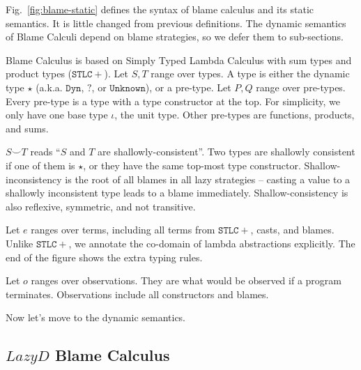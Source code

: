 \documentclass[acmsmall,review,anonymous]{acmart}\settopmatter{printfolios=true,printccs=false,printacmref=false}
\newcommand{\figref}[1]{Fig.~\ref{#1}}
\begin{document}
\figref{fig:blame-static} defines the syntax of blame calculus and its static 
semantics. It is little changed from previous definitions. 
The dynamic semantics of Blame Calculi depend on blame strategies, so we defer 
them to sub-sections.

Blame Calculus is based on Simply Typed Lambda Calculus with sum types and 
product types ($ \mathtt{STLC+} $). 
Let $ S,T $ range over types. A type is either the dynamic type $ \star $
(a.k.a. $ \mathtt{Dyn} $, $ \mathbb{?} $, or $ \mathtt{Unknown} $), 
or a pre-type. 
Let $ P,Q $ range over pre-types. Every pre-type is a type with a type 
constructor at the top. For simplicity, we only have one base type $ \iota $, 
the unit type. Other pre-types are functions, products, and sums.


$ S \smile T $ reads ``$ S $ and $ T $ are shallowly-consistent''. Two types 
are shallowly consistent if one of them is $ \star $, or they have the same 
top-most type constructor. Shallow-inconsistency is the root of all blames in 
all lazy strategies -- casting a value to a shallowly inconsistent type leads 
to a blame immediately. Shallow-consistency is also reflexive, symmetric, and 
not transitive.

Let $ e $ ranges over terms, including all terms from $ \mathtt{STLC+} $, 
casts, and blames. Unlike $ \mathtt{STLC+} $, we annotate the 
co-domain of lambda abstractions explicitly. 
The end of the figure shows the extra typing rules.

Let $ o $ ranges over observations. They are what would be observed if a 
program terminates. Observations include all constructors and blames.

Now let's move to the dynamic semantics. 

\subsection{$Lazy D$ Blame Calculus}
\end{document}
